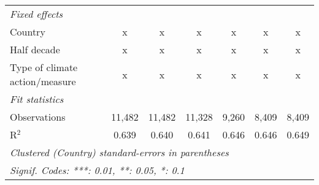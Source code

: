 \begin{tabular}{lcccccc}
   \emph{Fixed effects}\\
   Country                                                     & x       & x       & x       & x       & x            & x\\  
   Half decade                                                 & x       & x       & x       & x       & x            & x\\  
   Type of climate action/measure                              & x       & x       & x       & x       & x            & x\\  
   \midrule \emph{Fit statistics}\\
   Observations                                                & 11,482  & 11,482  & 11,328  & 9,260   & 8,409        & 8,409\\  
   R$^2$                                                       & 0.639   & 0.640   & 0.641   & 0.646   & 0.646        & 0.649\\  
   \midrule
   \multicolumn{7}{l}{\emph{Clustered (Country) standard-errors in parentheses}}\\
   \multicolumn{7}{l}{\emph{Signif. Codes: ***: 0.01, **: 0.05, *: 0.1}}\\
\end{tabular}
\par\endgroup


